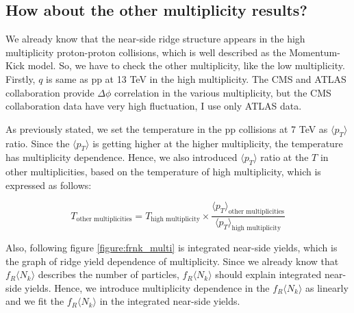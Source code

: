 \documentclass[jkps,fleqn,showpacs,showkeys]{revtex4}
\begin{document}
\subsection{How about the other multiplicity results?}
\label{subsec: How about the other multiplicity results?}

We already know that the near-side ridge structure appears in the high multiplicity proton-proton collisions, which is well described as the Momentum-Kick model.
So, we have to check the other multiplicity, like the low multiplicity.
Firstly, $q$ is same as pp at 13 TeV in the high multiplicity.
The CMS and ATLAS collaboration provide $\Delta \phi$ correlation in the various multiplicity, but the CMS collaboration data have very high fluctuation, I use only ATLAS data.

As previously stated, we set the temperature in the pp collisions at 7 TeV as $\langle p_T \rangle$ ratio.
Since the $\langle p_T \rangle$ is getting higher at the higher multiplicity\cite{ATLAS:2016zkp}, the temperature has multiplicity dependence.
Hence, we also introduced $\langle p_T \rangle$ ratio at the $T$ in other multiplicities, based on the temperature of high multiplicity, which is expressed as follows:

\begin{equation} \label{equation:variousmulti}
  T_{\text{other multiplicities}} = T_{\text{high multiplicity}} \times \frac{\langle p_T \rangle_{\text{other multiplicities}}}{\langle p_T \rangle_{\text{high multiplicity}}}
\end{equation}

Also, following figure \ref{figure:frnk_multi} is integrated near-side yields, which is the graph of ridge yield dependence of multiplicity.
Since we already know that $f_R \langle N_k \rangle$ describes the number of particles, $f_R \langle N_k \rangle$ should explain integrated near-side yields.
Hence, we introduce multiplicity dependence in the $f_R \langle N_k \rangle$ as linearly and we fit the $f_R \langle N_k \rangle$ in the integrated near-side yields.
\end{document}
